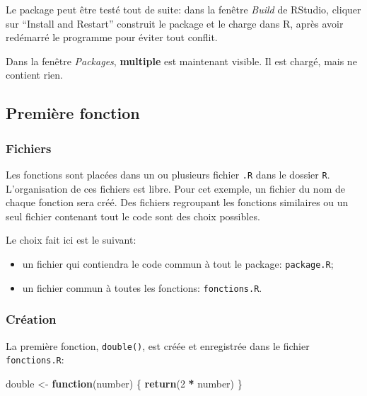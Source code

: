 \documentclass[
  12pt,
  french,
  a4paper,
  extrafontsizes,onecolumn,openright
  ]{memoir}
\newenvironment{Shaded}{\begin{snugshade}}{\end{snugshade}}
\newcommand{\ControlFlowTok}[1]{\textcolor[rgb]{0.13,0.29,0.53}{\textbf{#1}}}
\newcommand{\DecValTok}[1]{\textcolor[rgb]{0.00,0.00,0.81}{#1}}
\newcommand{\FunctionTok}[1]{\textcolor[rgb]{0.13,0.29,0.53}{\textbf{#1}}}
\newcommand{\NormalTok}[1]{#1}
\newcommand{\OtherTok}[1]{\textcolor[rgb]{0.56,0.35,0.01}{#1}}
\newcommand{\SpecialCharTok}[1]{\textcolor[rgb]{0.81,0.36,0.00}{\textbf{#1}}}
\providecommand{\tightlist}{%
  \setlength{\itemsep}{0pt}\setlength{\parskip}{0pt}}
\begin{document}
Le package peut être testé tout de suite: dans la fenêtre \emph{Build} de RStudio, cliquer sur \enquote{Install and Restart} construit le package et le charge dans R, après avoir redémarré le programme pour éviter tout conflit.

Dans la fenêtre \emph{Packages}, \textbf{multiple} est maintenant visible.
Il est chargé, mais ne contient rien.

\subsection{Première fonction}\label{premiuxe8re-fonction}

\subsubsection{Fichiers}\label{fichiers}

Les fonctions sont placées dans un ou plusieurs fichier \texttt{.R} dans le dossier \texttt{R}.
L'organisation de ces fichiers est libre.
Pour cet exemple, un fichier du nom de chaque fonction sera créé.
Des fichiers regroupant les fonctions similaires ou un seul fichier contenant tout le code sont des choix possibles.

Le choix fait ici est le suivant:

\begin{itemize}
\tightlist
\item
  un fichier qui contiendra le code commun à tout le package: \texttt{package.R};
\item
  un fichier commun à toutes les fonctions: \texttt{fonctions.R}.
\end{itemize}

\subsubsection{Création}\label{cruxe9ation-1}

La première fonction, \texttt{double()}, est créée et enregistrée dans le fichier \texttt{fonctions.R}:

\scriptsize

\begin{Shaded}
\begin{Highlighting}[]
\NormalTok{double }\OtherTok{\textless{}{-}} \ControlFlowTok{function}\NormalTok{(number) \{}
  \FunctionTok{return}\NormalTok{(}\DecValTok{2} \SpecialCharTok{*}\NormalTok{ number)}
\NormalTok{\}}
\end{Highlighting}
\end{Shaded}
\end{document}
